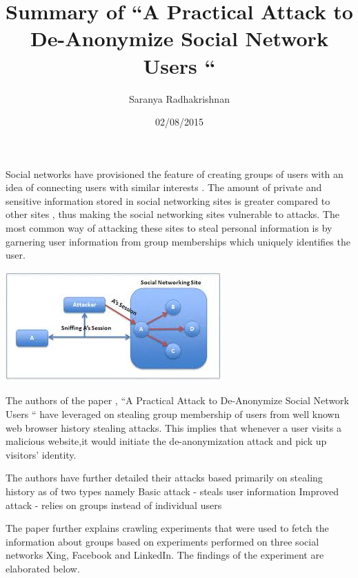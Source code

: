 \documentclass{article}
\title{Summary of  “A Practical Attack to De-Anonymize Social Network Users “}
\author{Saranya Radhakrishnan}
\date{02/08/2015}
\begin{document}
\maketitle

Social networks have provisioned the feature of creating  groups of users with an idea of  connecting users with similar interests . The amount of private and sensitive information stored in social networking sites is greater compared to other sites , thus making the social networking sites vulnerable to attacks. The most common way of attacking these sites to steal personal information is by garnering user information from group memberships which uniquely identifies the user. 

\begin{center}
\includegraphics{AttackInGraphicalFormat}
\end{center}


The authors of the paper , “A Practical Attack to De-Anonymize Social Network Users “  have leveraged on stealing group membership of users from well known web browser history stealing attacks. This implies that whenever a user visits a malicious website,it would initiate the de-anonymization attack and pick up visitors’ identity.


The authors have further detailed their attacks based primarily on stealing history as of two types namely
 Basic attack - steals user information
 Improved attack - relies on groups instead of individual users


The paper further explains crawling experiments that were used to fetch the information about 
groups based on experiments performed on three social networks Xing, Facebook and LinkedIn. The findings of the experiment are elaborated below.
\end{document}
